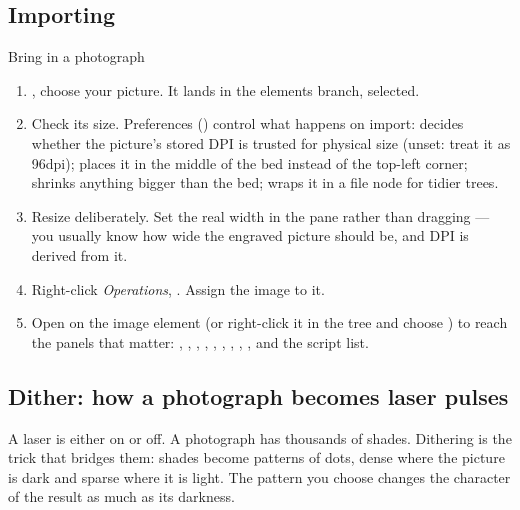 \subsection*{Importing}

\begin{walkthrough}{Bring in a photograph}
\begin{enumerate}[label=\arabic*.,leftmargin=1.4em]
  \item {}, choose your picture. It lands in the elements
        branch, selected.
  \item Check its size. Preferences () control what happens
        on import:  decides whether the picture's stored
        DPI is trusted for physical size (unset: treat it as 96\unit{dpi});
         places it in the middle of the bed instead
        of the top-left corner;  shrinks anything
        bigger than the bed;  wraps it
        in a file node for tidier trees.
  \item Resize deliberately. Set the real width in the  pane
        rather than dragging --- you usually know how wide the engraved picture
        should be, and DPI is derived from it.
  \item Right-click \emph{Operations}, .
        Assign the image to it.
  \item Open  on the image element (or right-click it in
        the tree and choose ) to reach the panels that
        matter: , , , ,
        , , , ,
        , and the  script list.
\end{enumerate}
\end{walkthrough}

\subsection*{Dither: how a photograph becomes laser pulses}

A laser is either on or off. A photograph has thousands of shades. Dithering is
the trick that bridges them: shades become patterns of dots, dense where the
picture is dark and sparse where it is light. The pattern you choose changes the
character of the result as much as its darkness.

